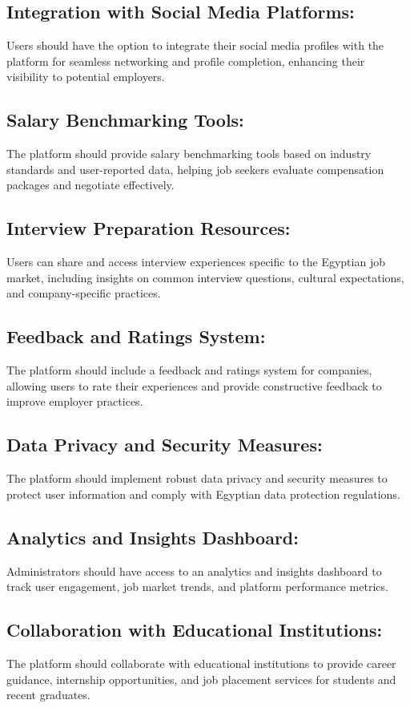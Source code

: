 \documentclass[titlepage]{article}
\begin{document}
\subsection{Integration with Social Media Platforms:}
Users should have the option to integrate their social media profiles with the platform for seamless networking and profile completion, enhancing their visibility to potential employers.


\subsection{Salary Benchmarking Tools:}
The platform should provide salary benchmarking tools based on industry standards and user-reported data, helping job seekers evaluate compensation packages and negotiate effectively.

\subsection{Interview Preparation Resources:}
Users can share and access interview experiences specific to the Egyptian job market, including insights on common interview questions, cultural expectations, and company-specific practices.


\subsection{Feedback and Ratings System:}
The platform should include a feedback and ratings system for companies, allowing users to rate their experiences and provide constructive feedback to improve employer practices.

\subsection{Data Privacy and Security Measures:}
The platform should implement robust data privacy and security measures to protect user information and comply with Egyptian data protection regulations.

\subsection{Analytics and Insights Dashboard:}
Administrators should have access to an analytics and insights dashboard to track user engagement, job market trends, and platform performance metrics.

\subsection{Collaboration with Educational Institutions:}
The platform should collaborate with educational institutions to provide career guidance, internship opportunities, and job placement services for students and recent graduates.
\end{document}
